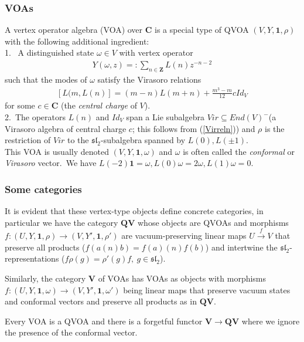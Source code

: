 \documentclass[12pt]{amsart}
\theoremstyle{plain}
\theoremstyle{definition}
\theoremstyle{remark}
\newcommand{\CC}{\mathbf{C}}
\newcommand{\ZZ}{\mathbf{Z}}
\begin{document}

\subsubsection{VOAs} A vertex operator algebra (VOA) over $\CC$
is a special type of QVOA $(V, Y, \mathbf{1}, \rho)$  with the following additional ingredient:\\
1. \ A distinguished state $\omega\in V$ with vertex operator 
\begin{eqnarray*}
   Y(\omega, z)=: \sum_{n\in\ZZ} L(n)z^{-n-2} 
\end{eqnarray*}
such that the modes of $\omega$ satisfy the Virasoro relations
\begin{eqnarray}\label{Virreln}
  [L(m, L(n)]=(m-n)L(m+n)+\frac{m^3-m}{12}cId_V 
\end{eqnarray} 
for some $c\in\CC$ (the \textit{central charge} of $V$).\\
2.\ The operators $L(n)$ and $Id_V$ span a Lie subalgebra $Vir\subseteq End(V)^-$(a Virasoro algebra of central charge $c$; this follows from (\ref{Virreln})) and $\rho$ is the restriction of $Vir$ to the 
$\mathfrak{sl}_2$-subalgebra spanned by $L(0), L(\pm1)$.\\
This VOA is usually denoted $(V, Y, \mathbf{1}, \omega)$ and $\omega$ is often called the \textit{conformal} or \textit{Virasoro} vector.\ We have $L(-2)\mathbf{1}=\omega, L(0)\omega=2\omega, L(1)\omega=0$.


\subsubsection{Some categories}\label{SScat} It is evident that these vertex-type objects  define concrete categories, in particular we have the category $\mathbf{QV}$ whose objects are
QVOAs and morphisms $f:(U, Y, \mathbf{1}, \rho)\rightarrow (V, Y', \mathbf{1}, \rho')$ are vacuum-preserving linear maps $U\stackrel{f}{\longrightarrow} V$ that preserve
all products ($f(a(n)b)=f(a)(n)f(b)$) and
intertwine the $\mathfrak{sl}_2$-representations ($f\rho(g)=\rho'(g)f,\ g\in\mathfrak{sl}_2$).\ 

\medskip
Similarly, the category $\mathbf{V}$ of VOAs has VOAs as objects with morphisms $f:(U, Y, \mathbf{1}, \omega)\rightarrow (V, Y', \mathbf{1}, \omega')$ being linear maps that preserve vacuum states and conformal vectors and preserve all products as in  $\mathbf{QV}$.

\medskip
Every VOA is a QVOA and there is a forgetful functor
$\mathbf{V}\longrightarrow \mathbf{QV}$
where we ignore the presence of the conformal vector.
\end{document}

